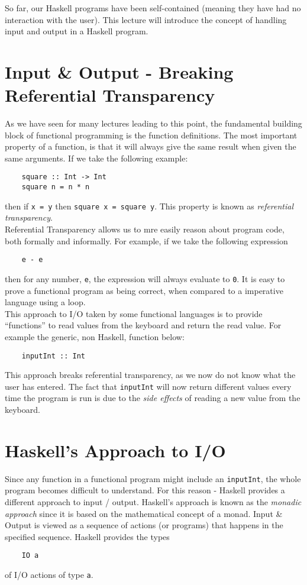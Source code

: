 
So far, our Haskell programs have been self-contained (meaning they have had no interaction with the user). This lecture will introduce the concept of handling input and output in a Haskell program. 

\section{Input \& Output - Breaking Referential Transparency}
As we have seen for many lectures leading to this point, the fundamental building block of functional programming is the function definitions. The most important property of a function, is that it will always give the same result when given the same arguments. If we take the following example:
\begin{verbatim}
    square :: Int -> Int
    square n = n * n
\end{verbatim}
then if \verb|x = y| then \verb|square x = square y|. This property is known as \textit{referential transparency}.\\

Referential Transparency allows us to mre easily reason about program code, both formally and informally. For example, if we take the following expression
\begin{verbatim}
    e - e
\end{verbatim}
then for any number, \verb|e|, the expression will always evaluate to \verb|0|. It is easy to prove a functional program as being correct, when compared to a imperative language using a loop.\\

This approach to I/O taken by some functional languages is to provide ``functions'' to read values from the keyboard and return the read value. For example the generic, non Haskell, function below:
\begin{verbatim}
    inputInt :: Int
\end{verbatim}
This approach breaks referential transparency, as we now do not know what the user has entered. The fact that \verb|inputInt| will now return different values every time the program is run is due to the \textit{side effects} of reading a new value from the keyboard. 

\section{Haskell's Approach to I/O}
Since any function in a functional program might include an \verb|inputInt|, the whole program becomes difficult to understand. For this reason - Haskell provides a different approach to input / output. Haskell's approach is known as the \textit{monadic approach} since it is based on the mathematical concept of a monad. Input \& Output is viewed as a sequence of actions (or programs) that happens in the specified sequence. Haskell provides the types
\begin{verbatim}
    IO a
\end{verbatim}
of I/O actions of type \verb|a|.\\


